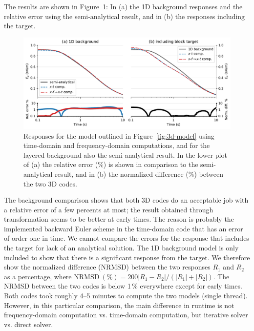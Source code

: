 \documentclass[extra, camera,%
    onecolumn,   %
    referee,     %
]{gji}
\newlength{\fwidth}
\newcommand{\mr}[1]{\mathrm{#1}}
\begin{document}
The results are shown in Figure~\ref{fig:3d-result}: In (a) the 1D background
responses and the relative error using the semi-analytical result, and in (b)
the responses including the target.
%
\begin{figure}
  \centering
  \includegraphics[width=\fwidth]{10-3d-result}
  \caption{Responses for the model outlined in Figure~\ref{fig:3d-model} using
    time-domain and frequency-domain computations, and for the layered
    background also the semi-analytical result. In the lower plot of (a) the
    relative error (\%) is shown in comparison to the semi-analytical result,
    and in (b) the normalized difference (\%) between the two 3D codes.
    }
  \label{fig:3d-result}
\end{figure}
%
The background comparison shows that both 3D codes do an acceptable job with a
relative error of a few percents at most; the result obtained through
transformation seems to be better at early times. The reason is probably the
implemented backward Euler scheme in the time-domain code that has an error of
order one in time. We cannot compare the errors for the response that includes
the target for lack of an analytical solution. The 1D background model is only
included to show that there is a significant response from the target. We
therefore show the normalized difference (NRMSD) between the two responses
$R_1$ and $R_2$ as a percentage, where $\mr{NRMSD~(\%)} = 200|R_1 - R_2|/(|R_1|
+ |R_2|)$. The NRMSD between the two codes is below 1\,\% everywhere except for
early times. Both codes took roughly 4--5 minutes to compute the two models
(single thread). However, in this particular comparison, the main difference in
runtime is not frequency-domain computation vs. time-domain computation, but
iterative solver vs. direct solver.


\subsection{} %
\end{document}

